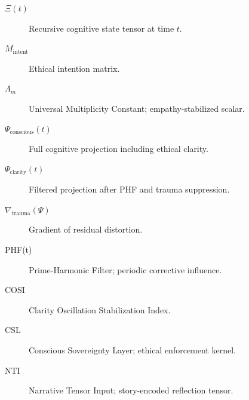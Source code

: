 \documentclass[12pt]{article}
\begin{document}
\begin{description}
  \item[$\Xi(t)$] Recursive cognitive state tensor at time $t$.
  \item[$M_{\text{intent}}$] Ethical intention matrix.
  \item[$\Lambda_m$] Universal Multiplicity Constant; empathy-stabilized scalar.
  \item[$\Psi_{\text{conscious}}(t)$] Full cognitive projection including ethical clarity.
  \item[$\Psi_{\text{clarity}}(t)$] Filtered projection after PHF and trauma suppression.
  \item[$\nabla_{\text{trauma}}(\Psi)$] Gradient of residual distortion.
  \item[PHF(t)] Prime-Harmonic Filter; periodic corrective influence.
  \item[COSI] Clarity Oscillation Stabilization Index.
  \item[CSL] Conscious Sovereignty Layer; ethical enforcement kernel.
  \item[NTI] Narrative Tensor Input; story-encoded reflection tensor.
\end{description}
\end{document}
